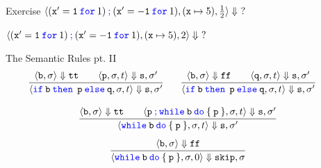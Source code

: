 \documentclass{beamer}
\newcommand{\blue}[1]{\textcolor{blue}{#1}}
\begin{document}
\begin{frame}{Exercise}
        $\langle (\mathtt{x' = 1} \> \mathtt{\blue{for}} \> 1) \>
                        \blue{\mathtt{;}} \> (\mathtt{x' = -1} \> \mathtt{\blue{for}} \> 1),
                        (\mathtt{x} \mapsto 5), \frac{1}{2} \rangle \Downarrow\ ?$ 

                        \vspace{1cm}

        $\langle (\mathtt{x' = 1} \> \mathtt{\blue{for}} \> 1) \>
                        \blue{\mathtt{;}} \> (\mathtt{x' = -1} \> \mathtt{\blue{for}} \> 1),
                        (\mathtt{x} \mapsto 5), 2 \rangle \Downarrow\ ?$ 

\end{frame} 
\begin{frame}{The Semantic Rules pt. II}
        \[\hspace{-0.4cm}
                \infer[]{
                        \langle \mathtt{\blue{if} \> b \> \blue{then} \> \> p \> \blue{else} \> q}, 
                        \sigma, t \rangle \Downarrow \mathtt{s}, \sigma'
                }{
                        \langle \mathtt{b}, \sigma \rangle \Downarrow \mathtt{tt} \qquad
                        \langle \mathtt{p}, \sigma, t \rangle \Downarrow \mathtt{s}, \sigma'
                } \hspace{0.5cm} 
                \infer[]{
                        \langle \mathtt{\blue{if} \> b \> \blue{then} \> \> p \> \blue{else} \> q}, 
                        \sigma, t \rangle \Downarrow \mathtt{s}, \sigma'
                }{
                        \langle \mathtt{b}, \sigma \rangle \Downarrow \mathtt{ff} \qquad
                        \langle \mathtt{q}, \sigma, t \rangle \Downarrow \mathtt{s}, \sigma'
                } 
        \]

        \[
                \infer[]{
                        \langle \mathtt{\blue{while} \> b \> \blue{do} \> \{ \> p \> \}}, 
                        \sigma, t \rangle \Downarrow \mathtt{s}, \sigma'
                }{
                        \langle \mathtt{b}, \sigma \rangle \Downarrow \mathtt{tt} \qquad
                        \langle \mathtt{\mathtt{p} \> \blue{\mathtt{;}} \> 
                        \blue{while} \> b \> \blue{do} \> \{ \> p \> \}}, \sigma, t
                        \rangle \Downarrow \mathtt{s}, \sigma' 
                }
        \]\vspace{0.001cm}
        \[
                \infer[]{
                        \langle \mathtt{\blue{while} \> b \> \blue{do} \> \{ \> p \> \}}, \sigma 
                        , 0 \rangle \Downarrow \mathtt{skip},\sigma
                }{
                        \langle \mathtt{b}, \sigma \rangle\Downarrow  \mathtt{ff}
                }
        \]
\end{frame}
\end{document}
